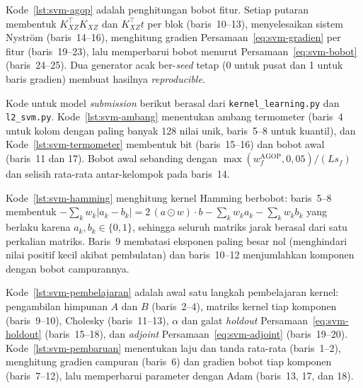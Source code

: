 
Kode~\ref{lst:svm-agop} adalah penghitungan bobot fitur. Setiap putaran membentuk $K_{XZ}^{\top}K_{XZ}$ dan $K_{XZ}^{\top}t$ per blok (baris~10--13), menyelesaikan sistem Nystr\"om (baris~14--16), menghitung gradien Persamaan~\eqref{eq:svm-gradien} per fitur (baris~19--23), lalu memperbarui bobot menurut Persamaan~\eqref{eq:svm-bobot} (baris~24--25). Dua generator acak ber-\textit{seed} tetap (0 untuk pusat dan 1 untuk baris gradien) membuat hasilnya \textit{reproducible}.


Kode untuk model \textit{submission} berikut berasal dari \texttt{kernel\_learning.py} dan \texttt{l2\_svm.py}. Kode~\ref{lst:svm-ambang} menentukan ambang termometer (baris~4 untuk kolom dengan paling banyak 128 nilai unik, baris~5--8 untuk kuantil), dan Kode~\ref{lst:svm-termometer} membentuk bit (baris~15--16) dan bobot awal (baris~11 dan 17). Bobot awal sebanding dengan $\max(w_f^{\text{AGOP}}, 0{,}05)/(L s_f)$ dan selisih rata-rata antar-kelompok pada baris~14.



Kode~\ref{lst:svm-hamming} menghitung kernel Hamming berbobot: baris~5--8 membentuk $-\sum_k w_k|a_k - b_k| = 2\,(a \odot w)\cdot b - \sum_k w_k a_k - \sum_k w_k b_k$ yang berlaku karena $a_k, b_k \in \{0,1\}$, sehingga seluruh matriks jarak berasal dari satu perkalian matriks. Baris~9 membatasi eksponen paling besar nol (menghindari nilai positif kecil akibat pembulatan) dan baris~10--12 menjumlahkan komponen dengan bobot campurannya.


Kode~\ref{lst:svm-pembelajaran} adalah awal satu langkah pembelajaran kernel: pengambilan himpunan $A$ dan $B$ (baris~2--4), matriks kernel tiap komponen (baris~9--10), Cholesky (baris~11--13), $\alpha$ dan galat \textit{holdout} Persamaan~\eqref{eq:svm-holdout} (baris~15--18), dan \textit{adjoint} Persamaan~\eqref{eq:svm-adjoint} (baris~19--20). Kode~\ref{lst:svm-pembaruan} menentukan laju dan tanda rata-rata (baris~1--2), menghitung gradien campuran (baris~6) dan gradien bobot tiap komponen (baris~7--12), lalu memperbarui parameter dengan Adam (baris~13, 17, dan 18).

